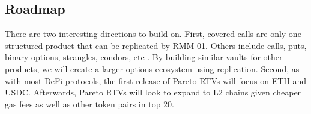 \documentclass[hidelinks, 12pt]{article}
\begin{document}
\subsection{Roadmap}

There are two interesting directions to build on. First, covered calls are only one structured product that can be replicated by RMM-01. Others include calls, puts, binary options, strangles, condors, etc \cite{sterrett2022replicating}. By building similar vaults for other products, we will create a larger options ecosystem using replication. Second, as with most DeFi protocols, the first release of Pareto RTVs will focus on ETH and USDC. Afterwards, Pareto RTVs will look to expand to L2 chains given cheaper gas fees as well as other token pairs in top 20.



\end{document}
